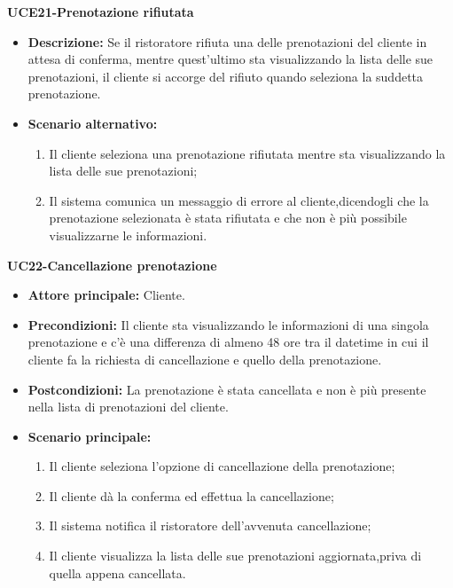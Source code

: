 \textbf{UCE21-Prenotazione rifiutata}
\begin{itemize}
    \item \textbf{Descrizione: }Se il ristoratore rifiuta una delle prenotazioni del cliente in attesa di conferma,
    mentre quest'ultimo sta visualizzando la lista delle sue prenotazioni, il cliente si accorge del rifiuto quando
    seleziona la suddetta prenotazione.
    \item \textbf{Scenario alternativo: }
    \begin{enumerate}
        \item Il cliente seleziona una prenotazione rifiutata mentre sta visualizzando la lista 
        delle sue prenotazioni;
        \item Il sistema comunica un messaggio di errore al cliente,dicendogli che la prenotazione selezionata 
        è stata rifiutata e che non è più possibile visualizzarne le informazioni.
    \end{enumerate}
\end{itemize}

\textbf{UC22-Cancellazione prenotazione}
\begin{itemize}
    \item \textbf{Attore principale: } Cliente.
    \item \textbf{Precondizioni: }Il cliente sta visualizzando le informazioni di una singola prenotazione
    e c'è una differenza di almeno 48 ore tra il datetime in cui il cliente fa la richiesta di cancellazione e quello della prenotazione.
    \item \textbf{Postcondizioni: }La prenotazione è stata cancellata e non è più presente nella lista di prenotazioni
    del cliente.
    \item \textbf{Scenario principale:} 
        \begin{enumerate}
            \item Il cliente seleziona l'opzione di cancellazione della prenotazione;
            \item Il cliente dà la conferma ed effettua la cancellazione;
            \item Il sistema notifica il ristoratore dell'avvenuta cancellazione;
            \item Il cliente visualizza la lista delle sue prenotazioni aggiornata,priva di quella appena
            cancellata.
        \end{enumerate}
\end{itemize}

